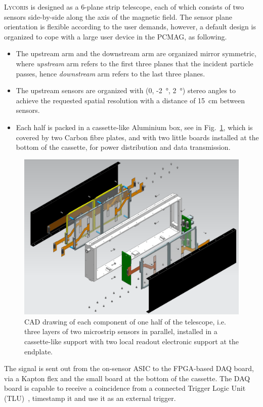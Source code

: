 \documentclass[journal]{IEEEtran}
\def\lycoris{\textsc{Lycoris}\xspace}%
\begin{document}
\lycoris is designed as a 6-plane strip telescope, each of which consists of two sensors side-by-side along the axis of the magnetic field.
The sensor plane orientation is flexible according to the user demands, however, a default design is organized to cope with a large user device in the PCMAG, as following.
\begin{itemize}
  \item The upstream arm and the downstream arm are organized mirror symmetric, where \textit{upstream} arm refers to the first three planes that the incident particle passes, hence \textit{downstream} arm refers to the last three planes.
  \item The upstream sensors are organized with (0, -\SI{2}{\degree}, \SI{2}{\degree}) stereo angles to achieve the requested spatial resolution with a distance of \SI{15}{cm} between sensors.
  \item Each half is packed in a cassette-like Aluminium box, see in Fig.~\ref{fig:intro1}, which is covered by two Carbon fibre plates, and with two little boards installed at the bottom of the cassette, for power distribution and data transmission.
\end{itemize}
\begin{figure}[!ht]
\centering
\includegraphics[width=0.8\linewidth]{pics/Explosion.png}
\caption{CAD drawing of each component of one half of the telescope,
i.e. three layers of two microstrip sensors in parallel,
installed in a cassette-like support with two local readout electronic support at the endplate.}
\label{fig:intro1}
\end{figure}
\IEEEpubidadjcol

The signal is sent out from the on-sensor ASIC to the FPGA-based DAQ board, via a Kapton flex and the small board at the bottom of the cassette.
The DAQ board is capable to receive a coincidence from a connected Trigger Logic Unit (TLU)~\cite{tlu}, timestamp it and use it as an external trigger.
\end{document}
